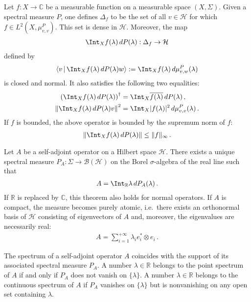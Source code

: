     \begin{property}
        Let $f:X\rightarrow\mathbb{C}$ be a measurable function on a measurable space $(X,\Sigma)$. Given a spectral measure $P$, one defines $\Delta_f$ to be the set of all $v\in\mathcal{H}$ for which $f\in L^2(X,\mu^P_{v,v})$. This set is dense in $\mathcal{H}$. Moreover, the map
        \begin{gather}
            \Int_Xf(\lambda)\,dP(\lambda):\Delta_f\rightarrow\mathcal{H}
        \end{gather}
        defined by
        \begin{gather}
            \left\langle v\,\middle\vert\,\Int_Xf(\lambda)\,dP(\lambda)w\right\rangle := \Int_Xf(\lambda)\,d\mu^P_{v,w}(\lambda)
        \end{gather}
        is closed and normal. It also satisfies the following two equalities:
        \begin{align}
            \left(\Int_Xf(\lambda)\,dP(\lambda)\right)^\dag &= \Int_X\overline{f(\lambda)}\,dP(\lambda)\,,\\
            \left\|\Int_Xf(\lambda)\,dP(\lambda)v\right\|^2 &= \Int_X|f(\lambda)|^2\,d\mu^P_{v,v}(\lambda)\,.
        \end{align}
        If $f$ is bounded, the above operator is bounded by the supremum norm of $f$:
        \begin{gather}
            \left\|\Int_Xf(\lambda)\,dP(\lambda)\right\|\leq\|f\|_\infty\,.
        \end{gather}
    \end{property}

    \begin{theorem}
        Let $A$ be a self-adjoint operator on a Hilbert space $\mathcal{H}$. There exists a unique spectral measure $P_A:\Sigma\rightarrow\mathcal{B}(\mathcal{H})$ on the Borel $\sigma$-algebra of the real line such that
        \begin{gather}
            A = \Int_{\mathbb{R}}\lambda\,dP_A(\lambda)\,.
        \end{gather}
        If $\mathbb{R}$ is replaced by $\mathbb{C}$, this theorem also holds for normal operators. If $A$ is compact, the measure becomes purely atomic, i.e.~there exists an orthonormal basis of $\mathcal{H}$ consisting of eigenvectors of $A$ and, moreover, the eigenvalues are necessarily real:
        \begin{gather}
            A = \sum_{i=1}^{+\infty}\lambda_ie_i^*\otimes e_i\,.
        \end{gather}
    \end{theorem}
    \begin{property}
        The spectrum of a self-adjoint operator $A$ coincides with the support of its associated spectral measure $P_A$. A number $\lambda\in\mathbb{R}$ belongs to the point spectrum of $A$ if and only if $P_A$ does not vanish on $\{\lambda\}$. A number $\lambda\in\mathbb{R}$ belongs to the continuous spectrum of $A$ if $P_A$ vanishes on $\{\lambda\}$ but is nonvanishing on any open set containing $\lambda$.
    \end{property}

